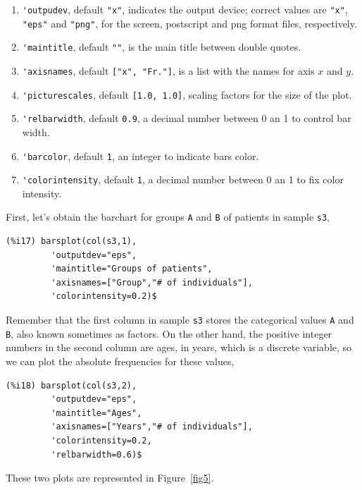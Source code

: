 \documentclass[12pt,a4paper]{article}
\begin{document}
\begin{description}
\begin{enumerate}
\item \verb|'outpudev|, default \verb|"x"|, indicates the output device; correct values are \verb|"x"|, \verb|"eps"| and \verb|"png"|, for the screen, postscript and png format files, respectively.
\item \verb|'maintitle|, default \verb|""|, is the main title between double quotes.
\item \verb|'axisnames|, default \verb|["x", "Fr."]|, is a list with the names for axis $x$ and $y$.
\item \verb|'picturescales|, default \verb|[1.0, 1.0]|, scaling factors for the size of the plot.
\item \verb|'relbarwidth|, default \verb|0.9|, a decimal number between 0 an 1 to control bar width.
\item \verb|'barcolor|, default \verb|1|, an integer to indicate bars color.
\item \verb|'colorintensity|, default \verb|1|, a decimal number between 0 an 1 to fix color intensity.
\end{enumerate}

First, let's obtain the barchart for groups \verb|A| and \verb|B| of patients in sample \verb|s3|,
\begin{verbatim}
(%i17) barsplot(col(s3,1),
         'outputdev="eps",
         'maintitle="Groups of patients",
         'axisnames=["Group","# of individuals"],
         'colorintensity=0.2)$
\end{verbatim}
Remember that the first column in sample \verb|s3| stores the categorical values \verb|A| and \verb|B|, also known sometimes as factors. On the other hand, the positive integer numbers in the second column are ages, in years, which is a discrete variable, so we can plot the absolute frequencies for these values,
\begin{verbatim}
(%i18) barsplot(col(s3,2),
         'outputdev="eps",
         'maintitle="Ages",
         'axisnames=["Years","# of individuals"],
         'colorintensity=0.2,
         'relbarwidth=0.6)$
\end{verbatim}

These two plots are represented in Figure~\ref{fig5}.


\end{description}
\end{document}
